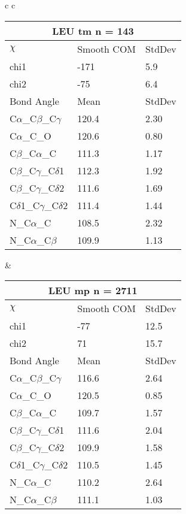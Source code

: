 \begin{longtable}{ c c }
  \begin{tabular}{ l l l }
  \toprule
  \multicolumn{3}{c}{LEU \textbf{tm} n = 143} \\ \toprule
  $\chi$       & Smooth COM & StdDev \\ \midrule
  chi1 & -171 & 5.9 \\ 
  chi2 & -75 & 6.4 \\ \midrule
  Bond Angle   & Mean     & StdDev \\ \midrule
  C$\alpha$\_C$\beta$\_C$\gamma$ & 120.4 & 2.30\\
  C$\alpha$\_C\_O & 120.6 & 0.80\\
  C$\beta$\_C$\alpha$\_C & 111.3 & 1.17\\
  C$\beta$\_C$\gamma$\_C$\delta$1 & 112.3 & 1.92\\
  C$\beta$\_C$\gamma$\_C$\delta$2 & 111.6 & 1.69\\
  C$\delta$1\_C$\gamma$\_C$\delta$2 & 111.4 & 1.44\\
  N\_C$\alpha$\_C & 108.5 & 2.32\\
  N\_C$\alpha$\_C$\beta$ & 109.9 & 1.13\\
  \bottomrule
  \end{tabular}
  &
  \begin{tabular}{ l l l }
  \toprule
  \multicolumn{3}{c}{LEU \textbf{mp} n = 2711} \\ \toprule
  $\chi$       & Smooth COM & StdDev \\ \midrule
  chi1 & -77 & 12.5 \\ 
  chi2 & 71 & 15.7 \\ \midrule
  Bond Angle   & Mean     & StdDev \\ \midrule
  C$\alpha$\_C$\beta$\_C$\gamma$ & 116.6 & 2.64\\
  C$\alpha$\_C\_O & 120.5 & 0.85\\
  C$\beta$\_C$\alpha$\_C & 109.7 & 1.57\\
  C$\beta$\_C$\gamma$\_C$\delta$1 & 111.6 & 2.04\\
  C$\beta$\_C$\gamma$\_C$\delta$2 & 109.9 & 1.58\\
  C$\delta$1\_C$\gamma$\_C$\delta$2 & 110.5 & 1.45\\
  N\_C$\alpha$\_C & 110.2 & 2.64\\
  N\_C$\alpha$\_C$\beta$ & 111.1 & 1.03\\
  \bottomrule
  \end{tabular}
  \\
  \begin{tabular}{ l l l }
  \toprule

\end{tabular}
\end{longtable}
